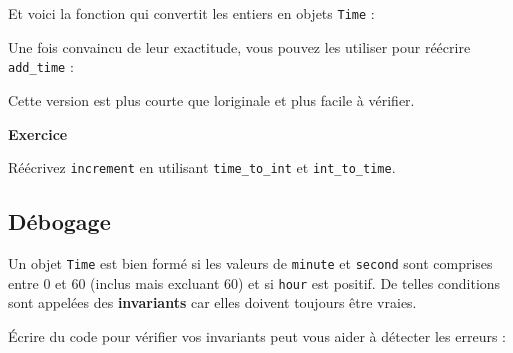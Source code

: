 Et voici la fonction qui convertit les entiers en objets \texttt{Time} :

\begin{Shaded}
\begin{Highlighting}[]
\OperatorTok{=}
\OperatorTok{=} \NormalTok{)}
\OperatorTok{=} \NormalTok{)}
\end{Highlighting}
\end{Shaded}

Une fois convaincu de leur exactitude, vous pouvez les utiliser pour
réécrire \texttt{add\_time} :

\begin{Shaded}
\begin{Highlighting}[]
\OperatorTok{=}\OperatorTok{+}
\end{Highlighting}
\end{Shaded}

Cette version est plus courte que l\textquotesingle originale et plus
facile à vérifier.

\textbf{Exercice}

Réécrivez \texttt{increment} en utilisant \texttt{time\_to\_int} et
\texttt{int\_to\_time}.

\hypertarget{duxe9bogage}{%
\subsection{Débogage}\label{duxe9bogage}}

Un objet \texttt{Time} est bien formé si les valeurs de \texttt{minute}
et \texttt{second} sont comprises entre 0 et 60 (inclus mais excluant
60) et si \texttt{hour} est positif. De telles conditions sont appelées
des \textbf{invariants} car elles doivent toujours être vraies.

Écrire du code pour vérifier vos invariants peut vous aider à détecter
les erreurs :

\begin{Shaded}
\begin{Highlighting}[]
    \OperatorTok{\textless{}}  \OperatorTok{\textless{}}  \OperatorTok{\textless{}} \NormalTok{:}
         
    \OperatorTok{\textgreater{}=}  \OperatorTok{\textgreater{}=} \NormalTok{:}
         
     
\end{Highlighting}
\end{Shaded}


